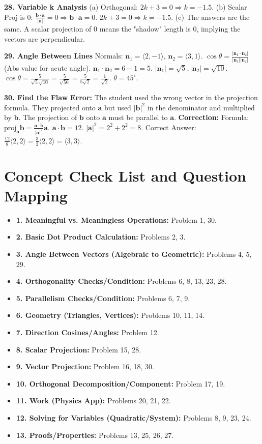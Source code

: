 \documentclass[12pt]{article}
\begin{document}
\textbf{28. Variable k Analysis}
(a) Orthogonal: $2k + 3 = 0 \Rightarrow k = -1.5$.
(b) Scalar Proj is 0: $\frac{\mathbf{b} \cdot \mathbf{a}}{|\mathbf{a}|} = 0 \Rightarrow \mathbf{b} \cdot \mathbf{a} = 0$.
$2k + 3 = 0 \Rightarrow k = -1.5$.
(c) The answers are the same. A scalar projection of 0 means the "shadow" length is 0, implying the vectors are perpendicular.

\textbf{29. Angle Between Lines}
Normals: $\mathbf{n}_1 = \langle 2, -1 \rangle$, $\mathbf{n}_2 = \langle 3, 1 \rangle$.
$\cos \theta = \frac{|\mathbf{n}_1 \cdot \mathbf{n}_2|}{|\mathbf{n}_1||\mathbf{n}_2|}$ (Abs value for acute angle).
$\mathbf{n}_1 \cdot \mathbf{n}_2 = 6 - 1 = 5$.
$|\mathbf{n}_1| = \sqrt{5}, |\mathbf{n}_2| = \sqrt{10}$.
$\cos \theta = \frac{5}{\sqrt{5}\sqrt{10}} = \frac{5}{\sqrt{50}} = \frac{5}{5\sqrt{2}} = \frac{1}{\sqrt{2}}$.
$\theta = 45^\circ$.

\textbf{30. Find the Flaw}
\textbf{Error:} The student used the wrong vector in the projection formula. They projected onto $\mathbf{a}$ but used $|\mathbf{b}|^2$ in the denominator and multiplied by $\mathbf{b}$. The projection of $\mathbf{b}$ onto $\mathbf{a}$ must be parallel to $\mathbf{a}$.
\textbf{Correction:} Formula: $\text{proj}_{\mathbf{a}} \mathbf{b} = \frac{\mathbf{a} \cdot \mathbf{b}}{|\mathbf{a}|^2} \mathbf{a}$.
$\mathbf{a} \cdot \mathbf{b} = 12$. $|\mathbf{a}|^2 = 2^2+2^2 = 8$.
Correct Answer: $\frac{12}{8} \langle 2, 2 \rangle = \frac{3}{2} \langle 2, 2 \rangle = \langle 3, 3 \rangle$.

\newpage
\section*{Concept Check List and Question Mapping}
\begin{itemize}
    \item \textbf{1. Meaningful vs. Meaningless Operations:} Problem 1, 30.
    \item \textbf{2. Basic Dot Product Calculation:} Problems 2, 3.
    \item \textbf{3. Angle Between Vectors (Algebraic to Geometric):} Problems 4, 5, 29.
    \item \textbf{4. Orthogonality Checks/Condition:} Problems 6, 8, 13, 23, 28.
    \item \textbf{5. Parallelism Checks/Condition:} Problems 6, 7, 9.
    \item \textbf{6. Geometry (Triangles, Vertices):} Problems 10, 11, 14.
    \item \textbf{7. Direction Cosines/Angles:} Problem 12.
    \item \textbf{8. Scalar Projection:} Problem 15, 28.
    \item \textbf{9. Vector Projection:} Problem 16, 18, 30.
    \item \textbf{10. Orthogonal Decomposition/Component:} Problem 17, 19.
    \item \textbf{11. Work (Physics App):} Problems 20, 21, 22.
    \item \textbf{12. Solving for Variables (Quadratic/System):} Problems 8, 9, 23, 24.
    \item \textbf{13. Proofs/Properties:} Problems 13, 25, 26, 27.
\end{itemize}
\end{document}
